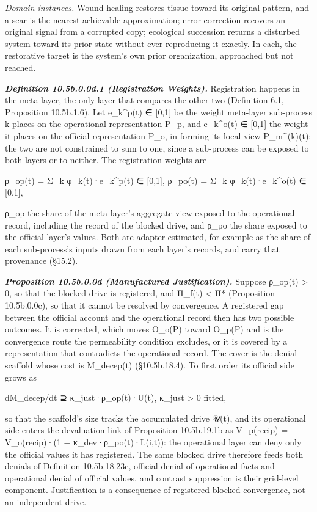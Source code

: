 \documentclass[
]{article}
\begin{document}
\emph{Domain instances.} Wound healing restores tissue toward its
original pattern, and a scar is the nearest achievable approximation;
error correction recovers an original signal from a corrupted copy;
ecological succession returns a disturbed system toward its prior state
without ever reproducing it exactly. In each, the restorative target is
the system's own prior organization, approached but not reached.

\emph{\textbf{Definition 10.5b.0.0d.1 (Registration Weights).}}
Registration happens in the meta-layer, the only layer that compares the
other two (Definition 6.1, Proposition 10.5b.1.6). Let e\_k\^{}p(t) ∈
{[}0,1{]} be the weight meta-layer sub-process k places on the
operational representation P\_p, and e\_k\^{}o(t) ∈ {[}0,1{]} the weight
it places on the official representation P\_o, in forming its local view
P\_m\^{}(k)(t); the two are not constrained to sum to one, since a
sub-process can be exposed to both layers or to neither. The
registration weights are

ρ\_op(t) = Σ\_k φ\_k(t)·e\_k\^{}p(t) ∈ {[}0,1{]}, ρ\_po(t) = Σ\_k
φ\_k(t)·e\_k\^{}o(t) ∈ {[}0,1{]},

ρ\_op the share of the meta-layer's aggregate view exposed to the
operational record, including the record of the blocked drive, and ρ\_po
the share exposed to the official layer's values. Both are
adapter-estimated, for example as the share of each sub-process's inputs
drawn from each layer's records, and carry that provenance (§15.2).

\emph{\textbf{Proposition 10.5b.0.0d (Manufactured Justification).}}
Suppose ρ\_op(t) \textgreater{} 0, so that the blocked drive is
registered, and Π\_f(t) \textless{} Π* (Proposition 10.5b.0.0c), so that
it cannot be resolved by convergence. A registered gap between the
official account and the operational record then has two possible
outcomes. It is corrected, which moves O\_o(P) toward O\_p(P) and is the
convergence route the permeability condition excludes, or it is covered
by a representation that contradicts the operational record. The cover
is the denial scaffold whose cost is M\_decep(t) (§10.5b.18.4). To first
order its official side grows as

dM\_decep/dt ⊇ κ\_just·ρ\_op(t)·U(t), κ\_just \textgreater{} 0 fitted,

so that the scaffold's size tracks the accumulated drive 𝒰(t), and its
operational side enters the devaluation link of Proposition 10.5b.19.1b
as V\_p(recip) = V\_o(recip)·(1 − κ\_dev·ρ\_po(t)·L(i,t)): the
operational layer can deny only the official values it has registered.
The same blocked drive therefore feeds both denials of Definition
10.5b.18.23c, official denial of operational facts and operational
denial of official values, and contrast suppression is their grid-level
component. Justification is a consequence of registered blocked
convergence, not an independent drive.
\end{document}
